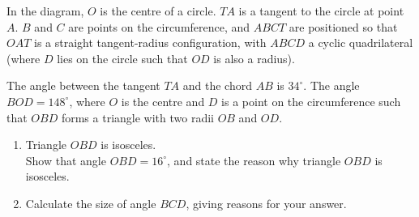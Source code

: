 \begin{question}
\noindent In the diagram, $O$ is the centre of a circle. $TA$ is a tangent to the circle at point $A$. $B$ and $C$ are points on the circumference, and $ABCT$ are positioned so that $OAT$ is a straight tangent-radius configuration, with $ABCD$ a cyclic quadrilateral (where $D$ lies on the circle such that $OD$ is also a radius).

The angle between the tangent $TA$ and the chord $AB$ is $34^\circ$. The angle $BOD = 148^\circ$, where $O$ is the centre and $D$ is a point on the circumference such that $OBD$ forms a triangle with two radii $OB$ and $OD$.

\begin{center}
\end{center}

\begin{enumerate}
    \item[(a)] Triangle $OBD$ is isosceles.\\
    Show that angle $OBD = 16^\circ$, and state the reason why triangle $OBD$ is isosceles.

    \vspace{4cm}

    \item[(b)] Calculate the size of angle $BCD$, giving reasons for your answer.

    \vspace{4.5cm}
\end{enumerate}
\end{question}
